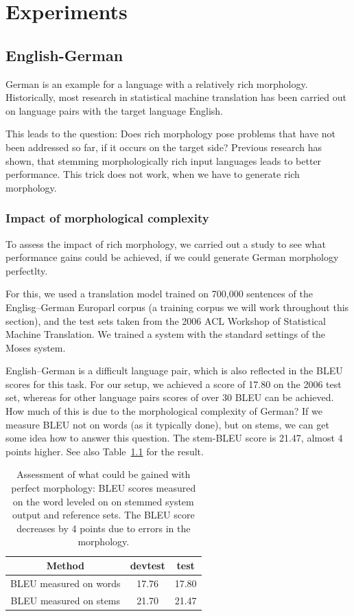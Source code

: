 \documentclass[11pt]{report}
\theoremstyle{plain}
\begin{document}
{\chapter{Experiments}

\section{English-German}

German is an example for a language with a relatively rich morphology. Historically, most research in statistical machine translation has been carried out on language pairs with the target language English.

This leads to the question: Does rich morphology pose problems that have not been addressed so far, if it occurs on the target side? Previous research has shown, that stemming morphologically rich input languages leads to better performance. This trick does not work, when we have to generate rich morphology.

\subsection{Impact of morphological complexity}
To assess the impact of rich morphology, we carried out a study to see what performance gains could be achieved, if we could generate German morphology perfectlty.

For this, we used a translation model trained on 700,000 sentences of the Englisg--German Europarl corpus (a training corpus we will work throughout this section), and the test sets taken from the 2006 ACL Workshop of Statistical Machine Translation. We trained a system with the standard settings of the Moses system.

English--German is a difficult language pair, which is also reflected in the BLEU scores for this task. For our setup, we achieved a score of 17.80 on the 2006 test set, whereas for other language pairs scores of over 30 BLEU can be achieved. How much of this is due to the morphological complexity of German? If we measure BLEU not on words (as it typically done), but on stems, we can get some idea how to answer this question. The stem-BLEU score is 21.47, almost 4 points higher. See also Table~\ref{tab:german:stem-bleu} for the result.

\begin{table}
\begin{center}
\begin{tabular}{|c|c|c|} \hline
\bf Method &  \bf devtest & \bf test\\ \hline
BLEU measured on words & 17.76 & 17.80 \\ \hline
BLEU measured on stems & 21.70 & 21.47 \\ \hline
\end{tabular}
\end{center}
\caption{Assessment of what could be gained with perfect morphology: BLEU scores measured on the word leveled on on stemmed system output and reference sets. The BLEU score decreases by 4 points due to errors in the morphology.}
\label{tab:german:stem-bleu}
\end{table}

}
\end{document}
